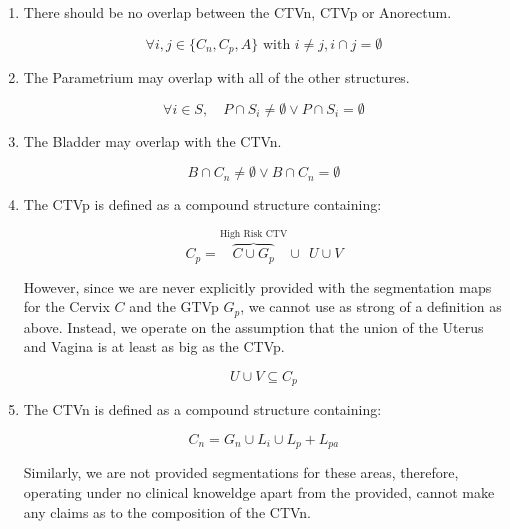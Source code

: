 \documentclass[12pt,twoside]{report}
\begin{document}
\begin{enumerate}
  \item There should be no overlap between the CTVn, CTVp or Anorectum.

        \begin{equation}
          \forall{i,j \in \{C_n, C_p, A\}}\text{ with } i \neq j, i \cap j = \emptyset
        \end{equation}

  \item The Parametrium may overlap with all of the other structures.

        \begin{equation}
          \forall i \in S, \quad P \cap S_i \neq \emptyset \vee P \cap S_i = \emptyset
        \end{equation}

  \item The Bladder may overlap with the CTVn.

        \begin{equation}
          B \cap C_n \neq \emptyset \vee B \cap C_n = \emptyset\label{eq:ctvn}
        \end{equation}

  \item The CTVp is defined as a compound structure containing:

        \begin{equation}
          C_p = \overbrace{C \cup G_p}^{\text{High Risk CTV}} \cup \ \ U \cup V\label{eq:ctvp1}
        \end{equation}

  However, since we are never explicitly provided with the segmentation maps for the Cervix $C$ and the GTVp $G_p$, we cannot use as strong of a definition as above. Instead, we operate on the assumption that the union of the Uterus and Vagina is at least as big as the CTVp.

        \begin{equation}
          U \cup V \subseteq C_p\label{eq:ctvp2}
        \end{equation}

  \item The CTVn is defined as a compound structure containing:

        \begin{equation}
          C_n = G_n \cup L_i \cup L_p + L_{pa}
        \end{equation}

  Similarly, we are not provided segmentations for these areas, therefore, operating under no clinical knoweldge apart from the provided, cannot make any claims as to the composition of the CTVn.

\end{enumerate}
\end{document}
